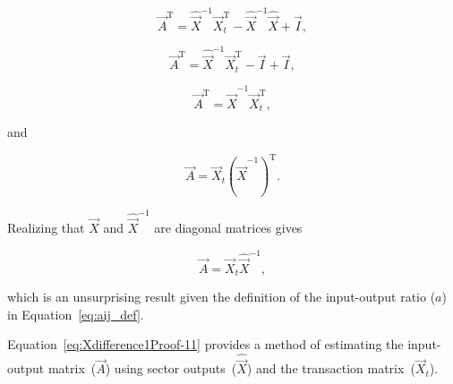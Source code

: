 \begin{equation}\label{eq:Xdifference1Proof-7}
	\vec{A}^\mathrm{T} 
	= \hat{\vec{X}}^{-1} \vec{X}_{t}^\mathrm{T} 
	- \hat{\vec{X}}^{-1} \hat{\vec{X}}
	+ \vec{I},	
\end{equation}

\begin{equation}\label{eq:Xdifference1Proof-8}
	\vec{A}^\mathrm{T} 
	= \hat{\vec{X}}^{-1} \vec{X}_{t}^\mathrm{T} 
	- \vec{I}
	+ \vec{I},	
\end{equation}

\begin{equation}\label{eq:Xdifference1Proof-9}
	\vec{A}^\mathrm{T} 
	= \hat{\vec{X}}^{-1} 
	\vec{X}_{t}^\mathrm{T},
\end{equation}

\noindent{}and

\begin{equation}\label{eq:Xdifference1Proof-10}
	\vec{A} 
	= \vec{X}_{t}
	\left( {\hat{\vec{X}}^{-1}} \right) ^\mathrm{T}.
\end{equation}

\noindent{}Realizing that $\hat{\vec{X}}$ and $\hat{\vec{X}}^{-1}$
are diagonal matrices gives

\begin{equation}\label{eq:Xdifference1Proof-11}
	\vec{A} 
	= \vec{X}_{t}
	\hat{\vec{X}}^{-1},
\end{equation}

\noindent{}which is an unsurprising result 
given the definition of the input-output ratio ($a$) in Equation~\ref{eq:aij_def}.

Equation~\ref{eq:Xdifference1Proof-11} provides a method 
of estimating the input-output matrix~($\vec{A}$) using
sector outputs~($\hat{\vec{X}}$) and the transaction matrix~($\vec{X}_{t}$).




